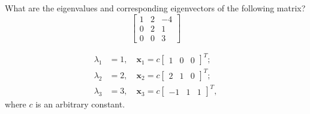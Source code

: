 \begin{pro}
  What are the eigenvalues and corresponding eigenvectors of the
  following matrix?
  \begin{displaymath}
    \begin{bmatrix}
      1 & 2 & -4 \\
      0 & 2 & 1 \\
      0 & 0 & 3
    \end{bmatrix}
  \end{displaymath}
\end{pro}

\begin{sol}
  \begin{align*}
    \lambda_1 &= 1, \quad \mathbf{x}_1 =c
    \begin{bmatrix}
      1 & 0 & 0
    \end{bmatrix}^T; \\
    \lambda_2 &= 2, \quad \mathbf{x}_2 =c
                \begin{bmatrix}
                  2 & 1 & 0
                \end{bmatrix}^T; \\
    \lambda_3 &= 3, \quad \mathbf{x}_3 = c
              \begin{bmatrix}
                -1 & 1 & 1
              \end{bmatrix}^T,
  \end{align*}
  where $c$ is an arbitrary constant.
\end{sol}
